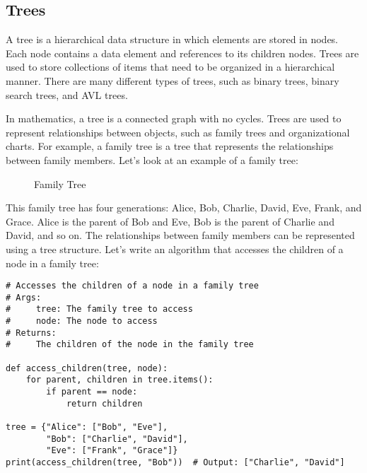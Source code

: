 \subsection{Trees}

A tree is a hierarchical data structure in which elements are stored in nodes. Each node contains a data element and references to its children nodes. Trees are used to store collections of items that need to be organized in a hierarchical manner. There are many different types of trees, such as binary trees, binary search trees, and AVL trees.

In mathematics, a tree is a connected graph with no cycles. Trees are used to represent relationships between objects, such as family trees and organizational charts. For example, a family tree is a tree that represents the relationships between family members. Let's look at an example of a family tree:


\begin{figure}[H]
    \centering
    \caption{Family Tree}\label{fig:family-tree}
\end{figure}


This family tree has four generations: Alice, Bob, Charlie, David, Eve, Frank, and Grace. Alice is the parent of Bob and Eve, Bob is the parent of Charlie and David, and so on. The relationships between family members can be represented using a tree structure. Let's write an algorithm that accesses the children of a node in a family tree:

\begin{lstlisting}
# Accesses the children of a node in a family tree
# Args:
#     tree: The family tree to access
#     node: The node to access
# Returns:
#     The children of the node in the family tree

def access_children(tree, node):
    for parent, children in tree.items():
        if parent == node:
            return children

tree = {"Alice": ["Bob", "Eve"],
        "Bob": ["Charlie", "David"],
        "Eve": ["Frank", "Grace"]}
print(access_children(tree, "Bob"))  # Output: ["Charlie", "David"]
\end{lstlisting}

